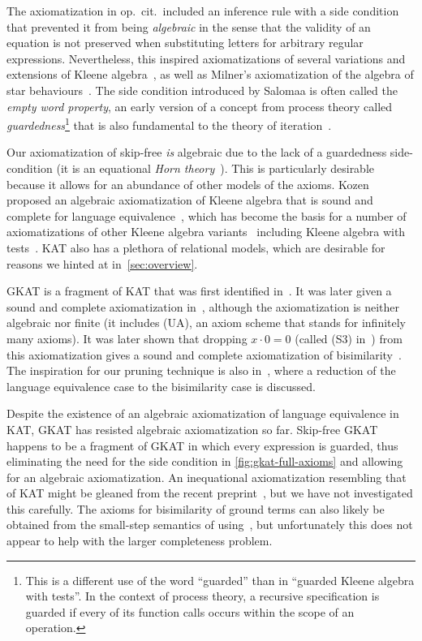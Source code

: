 \documentclass[orivec,envcountsect,envcountsame]{llncs}
\begin{document}
The axiomatization in op.\ cit.\ included an inference rule with a side condition that prevented it from being \emph{algebraic} in the sense that the validity of an equation is not preserved when substituting letters for arbitrary regular expressions.
Nevertheless, this inspired axiomatizations of several variations and extensions of Kleene algebra~\cite{ska,gkatpopl,processesparametrised}, as well as Milner's axiomatization of the algebra of star behaviours~\cite{milner}.
The side condition introduced by Salomaa is often called the \emph{empty word property}, an early version of a concept from process theory called \emph{guardedness}\footnote{This is a different use of the word ``guarded'' than in ``guarded Kleene algebra with tests''. In the context of process theory, a recursive specification is guarded if every of its function calls occurs within the scope of an operation.} that is also fundamental to the theory of iteration~\cite{bloomesik}.

Our axiomatization of skip-free \GKAT \emph{is} algebraic due to the lack of a guardedness side-condition (it is an equational \emph{Horn theory}~\cite{horntheory}).
This is particularly desirable because it allows for an abundance of other models of the axioms.
Kozen proposed an algebraic axiomatization of Kleene algebra that is sound and complete for language equivalence~\cite{kozen}, which has become the basis for a number of axiomatizations of other Kleene algebra variants~\cite{netkat-decision,kao,ckao,pocka} including Kleene algebra with tests~\cite{katintro}.
\textsf{KAT} also has a plethora of relational models, which are desirable for reasons we hinted at in~\cref{sec:overview}.

\textsf{GKAT} is a fragment of \textsf{KAT} that was first identified in~\cite{kozentseng}.
It was later given a sound and complete axiomatization in~\cite{gkatpopl}, although the axiomatization is neither algebraic nor finite (it includes (\textsf{UA}), an axiom scheme that stands for infinitely many axioms).
It was later shown that dropping \(x\cdot 0 = 0\) (called (S3) in~\cite{gkatpopl}) from this axiomatization gives a sound and complete axiomatization of bisimilarity~\cite{gkaticalp}.
The inspiration for our pruning technique is also in~\cite{gkaticalp}, where a reduction of the language equivalence case to the bisimilarity case is discussed.

Despite the existence of an algebraic axiomatization of language equivalence in \textsf{KAT}, \textsf{GKAT} has resisted algebraic axiomatization so far.
Skip-free \textsf{GKAT} happens to be a fragment of \textsf{GKAT} in which every expression is guarded, thus eliminating the need for the side condition in \cref{fig:gkat-full-axioms} and allowing for an algebraic axiomatization.
An inequational axiomatization resembling that of \textsf{KAT} might be gleaned from the recent preprint~\cite{orderedprocesses}, but we have not investigated this carefully.
The \GKAT axioms for bisimilarity of ground terms can also likely be obtained from the small-step semantics of \GKAT using~\cite{aceto94complete,aceto11gsos,aceto11preg}, but unfortunately this does not appear to help with the larger completeness problem.
\end{document}
